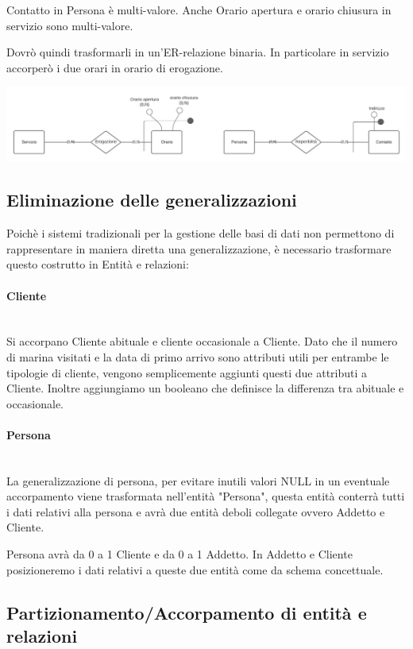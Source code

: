 Contatto in Persona è multi-valore. Anche Orario apertura e orario chiusura in servizio sono multi-valore.

Dovrò quindi trasformarli in un'ER-relazione binaria. In particolare in servizio accorperò i due orari in orario di erogazione.

\includegraphics[width=\linewidth]{img/multi_valore.png}

\subsection{Eliminazione delle generalizzazioni}

Poichè i sistemi tradizionali per la gestione delle basi di dati non permettono di rappresentare in maniera diretta una generalizzazione, è necessario trasformare questo costrutto in Entità e relazioni:

\paragraph{Cliente}\mbox{}\\
Si accorpano Cliente abituale e cliente occasionale a Cliente. Dato che il numero di marina visitati e la data di primo arrivo sono attributi utili per entrambe le tipologie di cliente, vengono semplicemente aggiunti questi due attributi a Cliente. Inoltre aggiungiamo un booleano che definisce la differenza tra abituale e occasionale.
\paragraph{Persona}\mbox{}\\
La generalizzazione di persona, per evitare inutili valori NULL in un eventuale accorpamento viene trasformata nell'entità "Persona", questa entità conterrà tutti i dati relativi alla persona e avrà due entità deboli collegate ovvero Addetto e Cliente.

Persona avrà da 0 a 1 Cliente e da 0 a 1 Addetto. In Addetto e Cliente posizioneremo i dati relativi a queste due entità come da schema concettuale.

\subsection{Partizionamento/Accorpamento di entità e relazioni}

